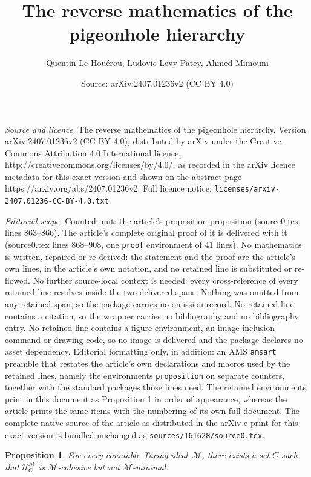 \documentclass[10pt,a4paper]{amsart}
\title{The reverse mathematics of the pigeonhole hierarchy}
\author{Quentin Le Hou\'erou, Ludovic Levy Patey, Ahmed Mimouni}
\date{Source: arXiv:2407.01236v2 (CC BY 4.0)}
\newtheorem{proposition}{Proposition}
\def\M{\mathcal{M}}
\def\U{\mathcal{U}}
\begin{document}
\maketitle

\noindent\emph{Source and licence.} The reverse mathematics of the pigeonhole hierarchy. Version arXiv:2407.01236v2 (CC BY 4.0), distributed by arXiv under the Creative Commons Attribution 4.0 International licence, http://creativecommons.org/licenses/by/4.0/, as recorded in the arXiv licence metadata for this exact version and shown on the abstract page https://arxiv.org/abs/2407.01236v2. Full licence notice: \texttt{licenses/arxiv-2407.01236-CC-BY-4.0.txt}.\par\smallskip

\noindent\textit{Editorial scope.} Counted unit: the article's proposition proposition (source0.tex lines 863--866). The article's complete original proof of it is delivered with it (source0.tex lines 868--908, one \texttt{proof} environment of 41 lines). No mathematics is written, repaired or re-derived: the statement and the proof are the article's own lines, in the article's own notation, and no retained line is substituted or re-flowed.  No further source-local context is needed: every cross-reference of every retained line resolves inside the two delivered spans.  Nothing was omitted from any retained span, so the package carries no omission record.  No retained line contains a citation, so the wrapper carries no bibliography and no bibliography entry.  No retained line contains a figure environment, an image-inclusion command or drawing code, so no image is delivered and the package declares no asset dependency.  Editorial formatting only, in addition: an AMS \texttt{amsart} preamble that restates the article's own declarations and macros used by the retained lines, namely the environments \texttt{proposition} on separate counters, together with the standard packages those lines need.  The retained environments print in this document as Proposition 1 in order of appearance, whereas the article prints the same items with the numbering of its own full document.  The complete native source of the article as distributed in the arXiv e-print for this exact version is bundled unchanged as \texttt{sources/161628/source0.tex}.
\begin{proposition}
For every countable Turing ideal~$\M$, there exists a set $C$ such that $\U_C^\M$ is $\M$-cohesive but not $\M$-minimal.
\end{proposition}
\end{document}
